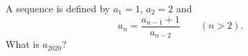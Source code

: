 A sequence is defined by $a_1=1$, $a_2=2$ and
\[
a_n=\dfrac{a_{n-1}+1}{a_{n-2}}\qquad(n>2).
\]
What is $a_{2020}$?
